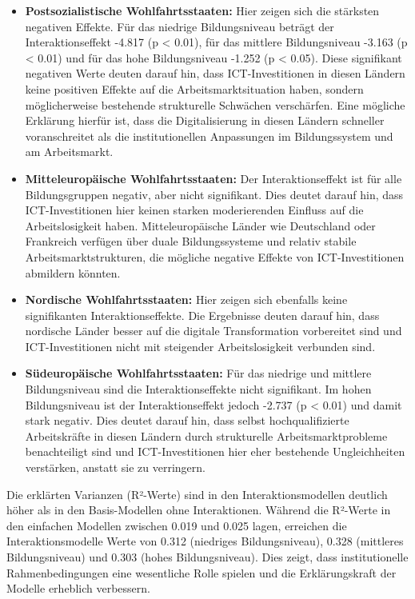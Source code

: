 \begin{itemize}
    \item \textbf{Postsozialistische Wohlfahrtsstaaten:} Hier zeigen sich 
    die stärksten negativen Effekte. Für das niedrige Bildungsniveau beträgt der 
    Interaktionseffekt -4.817 (p < 0.01), für das mittlere Bildungsniveau -3.163 (p < 0.01) und 
    für das hohe Bildungsniveau -1.252 (p < 0.05). Diese signifikant negativen Werte 
    deuten darauf hin, dass ICT-Investitionen in diesen Ländern keine positiven Effekte 
    auf die Arbeitsmarktsituation haben, sondern möglicherweise bestehende 
    strukturelle Schwächen verschärfen. Eine mögliche Erklärung hierfür ist, dass die 
    Digitalisierung in diesen Ländern schneller voranschreitet als die institutionellen 
    Anpassungen im Bildungssystem und am Arbeitsmarkt.
    
    \item \textbf{Mitteleuropäische Wohlfahrtsstaaten:} Der Interaktionseffekt ist für alle 
    Bildungsgruppen negativ, aber nicht signifikant. Dies deutet darauf hin, dass 
    ICT-Investitionen hier keinen starken moderierenden Einfluss auf die Arbeitslosigkeit 
    haben. Mitteleuropäische Länder wie Deutschland oder Frankreich verfügen über 
    duale Bildungssysteme und relativ stabile Arbeitsmarktstrukturen, die mögliche 
    negative Effekte von ICT-Investitionen abmildern könnten.
    
    \item \textbf{Nordische Wohlfahrtsstaaten:} Hier zeigen sich ebenfalls keine signifikanten 
    Interaktionseffekte. Die Ergebnisse deuten darauf hin, dass nordische Länder besser 
    auf die digitale Transformation vorbereitet sind und ICT-Investitionen nicht mit 
    steigender Arbeitslosigkeit verbunden sind.
    
    \item \textbf{Südeuropäische Wohlfahrtsstaaten:} Für das niedrige und mittlere Bildungsniveau 
    sind die Interaktionseffekte nicht signifikant. Im hohen Bildungsniveau ist der 
    Interaktionseffekt jedoch -2.737 (p < 0.01) und damit stark negativ. Dies deutet 
    darauf hin, dass selbst hochqualifizierte Arbeitskräfte in diesen Ländern durch 
    strukturelle Arbeitsmarktprobleme benachteiligt sind und ICT-Investitionen hier eher 
    bestehende Ungleichheiten verstärken, anstatt sie zu verringern.
\end{itemize}

Die erklärten Varianzen (R²-Werte) sind in den Interaktionsmodellen deutlich höher als in 
den Basis-Modellen ohne Interaktionen. Während die R²-Werte in den einfachen Modellen 
zwischen 0.019 und 0.025 lagen, erreichen die Interaktionsmodelle Werte von 0.312 
(niedriges Bildungsniveau), 0.328 (mittleres Bildungsniveau) und 0.303 (hohes Bildungsniveau). 
Dies zeigt, dass institutionelle Rahmenbedingungen eine wesentliche Rolle spielen und die 
Erklärungskraft der Modelle erheblich verbessern.

